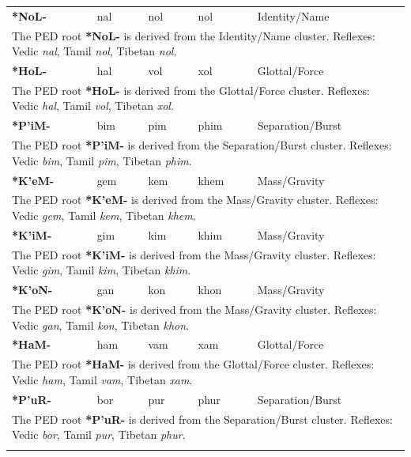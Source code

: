 \begin{longtable}{p{} p{} p{} p{} p{}}
\textbf{*NoL-} & nal & nol & nol & Identity/Name \\ 
\multicolumn{5}{p{\textwidth}}{\small The PED root \textbf{*NoL-} is derived from the Identity/Name cluster. Reflexes: Vedic \textit{nal}, Tamil \textit{nol}, Tibetan \textit{nol}. } \\ \addlinespace 
\textbf{*HoL-} & hal & vol & xol & Glottal/Force \\ 
\multicolumn{5}{p{\textwidth}}{\small The PED root \textbf{*HoL-} is derived from the Glottal/Force cluster. Reflexes: Vedic \textit{hal}, Tamil \textit{vol}, Tibetan \textit{xol}. } \\ \addlinespace 
\textbf{*P'iM-} & bim & pim & phim & Separation/Burst \\ 
\multicolumn{5}{p{\textwidth}}{\small The PED root \textbf{*P'iM-} is derived from the Separation/Burst cluster. Reflexes: Vedic \textit{bim}, Tamil \textit{pim}, Tibetan \textit{phim}. } \\ \addlinespace 
\textbf{*K'eM-} & gem & kem & khem & Mass/Gravity \\ 
\multicolumn{5}{p{\textwidth}}{\small The PED root \textbf{*K'eM-} is derived from the Mass/Gravity cluster. Reflexes: Vedic \textit{gem}, Tamil \textit{kem}, Tibetan \textit{khem}. } \\ \addlinespace 
\textbf{*K'iM-} & gim & kim & khim & Mass/Gravity \\ 
\multicolumn{5}{p{\textwidth}}{\small The PED root \textbf{*K'iM-} is derived from the Mass/Gravity cluster. Reflexes: Vedic \textit{gim}, Tamil \textit{kim}, Tibetan \textit{khim}. } \\ \addlinespace 
\textbf{*K'oN-} & gan & kon & khon & Mass/Gravity \\ 
\multicolumn{5}{p{\textwidth}}{\small The PED root \textbf{*K'oN-} is derived from the Mass/Gravity cluster. Reflexes: Vedic \textit{gan}, Tamil \textit{kon}, Tibetan \textit{khon}. } \\ \addlinespace 
\textbf{*HaM-} & ham & vam & xam & Glottal/Force \\ 
\multicolumn{5}{p{\textwidth}}{\small The PED root \textbf{*HaM-} is derived from the Glottal/Force cluster. Reflexes: Vedic \textit{ham}, Tamil \textit{vam}, Tibetan \textit{xam}. } \\ \addlinespace 
\textbf{*P'uR-} & bor & pur & phur & Separation/Burst \\ 
\multicolumn{5}{p{\textwidth}}{\small The PED root \textbf{*P'uR-} is derived from the Separation/Burst cluster. Reflexes: Vedic \textit{bor}, Tamil \textit{pur}, Tibetan \textit{phur}. } \\ \addlinespace 

\end{longtable}
